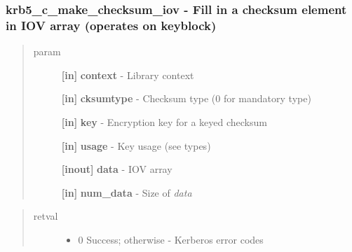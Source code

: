 \documentclass[letterpaper,10pt,english]{sphinxmanual}
\begin{document}
\subsubsection{krb5\_c\_make\_checksum\_iov -  Fill in a checksum element in IOV array (operates on keyblock)}
\label{appdev/refs/api/krb5_c_make_checksum_iov:krb5-c-make-checksum-iov-fill-in-a-checksum-element-in-iov-array-operates-on-keyblock}\label{appdev/refs/api/krb5_c_make_checksum_iov::doc}

\begin{fulllineitems}
\label{appdev/refs/api/krb5_c_make_checksum_iov:c.krb5_c_make_checksum_iov}
\end{fulllineitems}

\begin{quote}\begin{description}
\item[{param}] \leavevmode
\textbf{{[}in{]}} \textbf{context} - Library context

\textbf{{[}in{]}} \textbf{cksumtype} - Checksum type (0 for mandatory type)

\textbf{{[}in{]}} \textbf{key} - Encryption key for a keyed checksum

\textbf{{[}in{]}} \textbf{usage} - Key usage (see  types)

\textbf{{[}inout{]}} \textbf{data} - IOV array

\textbf{{[}in{]}} \textbf{num\_data} - Size of \emph{data}

\end{description}\end{quote}
\begin{quote}\begin{description}
\item[{retval}] \leavevmode\begin{itemize}
\item {} 
0   Success; otherwise - Kerberos error codes

\end{itemize}

\end{description}\end{quote}
\end{document}
